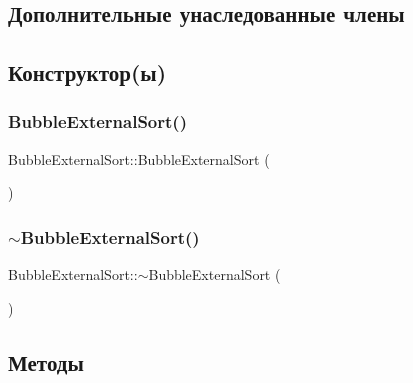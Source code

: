 \subsection*{Дополнительные унаследованные члены}


\subsection{Конструктор(ы)}
\hypertarget{class_bubble_external_sort_a420f93ff7677a75557f805749011f86e}{}\label{class_bubble_external_sort_a420f93ff7677a75557f805749011f86e} 
\subsubsection{\texorpdfstring{Bubble\+External\+Sort()}{BubbleExternalSort()}}
{\footnotesize\ttfamily Bubble\+External\+Sort\+::\+Bubble\+External\+Sort (\begin{DoxyParamCaption}{ }\end{DoxyParamCaption})}

\hypertarget{class_bubble_external_sort_a2075c6e2117da937f397ceb993336e81}{}\label{class_bubble_external_sort_a2075c6e2117da937f397ceb993336e81} 
\subsubsection{\texorpdfstring{$\sim$\+Bubble\+External\+Sort()}{~BubbleExternalSort()}}
{\footnotesize\ttfamily Bubble\+External\+Sort\+::$\sim$\+Bubble\+External\+Sort (\begin{DoxyParamCaption}{ }\end{DoxyParamCaption})}



\subsection{Методы}
\hypertarget{class_bubble_external_sort_ac2c8c1a8dad0f0f99a176d3641b7625c}{}\label{class_bubble_external_sort_ac2c8c1a8dad0f0f99a176d3641b7625c} 
